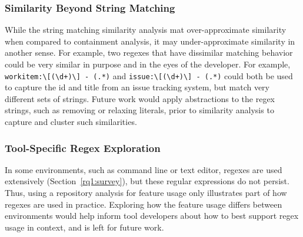 \subsubsection{Similarity Beyond String Matching}
While the string matching similarity analysis mat over-approximate similarity when compared to containment analysis, it may under-approximate similarity in another sense.
For example, two regexes that have dissimilar matching behavior could be very similar in purpose and in the eyes of the developer. For example, \verb!workitem:\[(\d+)\] - (.*)! and \verb!issue:\[(\d+)\] - (.*)! could both be used to  capture the id and title from an issue tracking system, but match very different sets of strings. Future work would apply abstractions to the regex strings, such as removing or relaxing literals, prior to similarity analysis to capture and cluster such similarities.

\subsubsection{Tool-Specific Regex Exploration}
In some environments, such as command line or text editor, regexes are used extensively (Section~\ref{rq1:survey}), but these regular expressions do not persist. Thus, using a repository analysis for feature usage only illustrates part of how regexes are used in practice. Exploring how the feature usage differs between environments would help inform tool developers about how to best support regex usage in context, and is left for future work.




